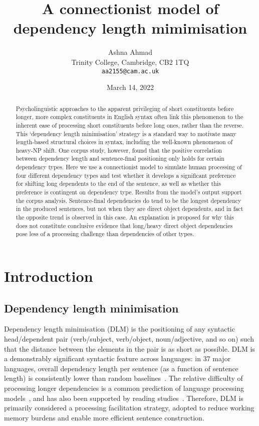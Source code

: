 \documentclass{article}
\title{A connectionist model of dependency length mimimisation }
\date{March 14, 2022}
\author{ Ashna Ahmad  \\
Trinity College, Cambridge, CB2 1TQ \\
\texttt{aa2155@cam.ac.uk}
}
\begin{document}
\maketitle

\begin{abstract}
	Psycholinguistic approaches to the apparent privileging of short constituents before longer, more complex constituents in English syntax often link this phenomenon to the inherent ease of processing short constituents before long ones, rather than the reverse. This `dependency length minimisation' strategy is a standard way to motivate many length-based structural choices in syntax, including the well-known phenomenon of heavy-NP shift. One corpus study, however, found that the positive correlation between dependency length and sentence-final positioning only holds for certain dependency types. Here we use a connectionist model to simulate human processing of four different dependency types and test whether it develops a significant preference for shifting long dependents to the end of the sentence, as well as whether this preference is contingent on dependency type. Results from the model's output support the corpus analysis. Sentence-final dependencies do tend to be the longest dependency in the produced sentences, but not when they are direct object dependents, and in fact the opposite trend is observed in this case. An explanation is proposed for why this does not constitute conclusive evidence that long/heavy direct object dependencies pose less of a processing challenge than dependencies of other types.   
\end{abstract}


\section{Introduction}
\subsection{Dependency length minimisation}
Dependency length minimisation (DLM) is the positioning of any syntactic head/dependent pair (verb/subject, verb/object, noun/adjective, and so on) such that the distance between the elements in the pair is as short as possible. DLM is a demonstrably significant syntactic feature across languages: in 37 major languages, overall dependency length per sentence (as a function of sentence length) is consistently lower than random baselines~\cite{futrell2015}. The relative difficulty of processing longer dependencies is a common prediction of language processing models~\cite{gibson1998}, and has also been supported by reading studies~\cite{grodner2005}. Therefore, DLM is primarily considered a processing facilitation strategy, adopted to reduce working memory burdens and enable more efficient sentence construction.
\end{document}
